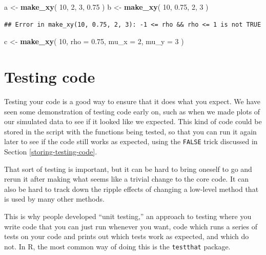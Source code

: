 \documentclass[
]{book}
\newenvironment{Shaded}{\begin{snugshade}}{\end{snugshade}}
\newcommand{\AttributeTok}[1]{\textcolor[rgb]{0.13,0.29,0.53}{#1}}
\newcommand{\DecValTok}[1]{\textcolor[rgb]{0.00,0.00,0.81}{#1}}
\newcommand{\FloatTok}[1]{\textcolor[rgb]{0.00,0.00,0.81}{#1}}
\newcommand{\FunctionTok}[1]{\textcolor[rgb]{0.13,0.29,0.53}{\textbf{#1}}}
\newcommand{\NormalTok}[1]{#1}
\newcommand{\OtherTok}[1]{\textcolor[rgb]{0.56,0.35,0.01}{#1}}
\begin{document}
\begin{Shaded}
\begin{Highlighting}[]
\NormalTok{a }\OtherTok{\textless{}{-}} \FunctionTok{make\_xy}\NormalTok{( }\DecValTok{10}\NormalTok{, }\DecValTok{2}\NormalTok{, }\DecValTok{3}\NormalTok{, }\FloatTok{0.75}\NormalTok{ )}
\NormalTok{b }\OtherTok{\textless{}{-}} \FunctionTok{make\_xy}\NormalTok{( }\DecValTok{10}\NormalTok{, }\FloatTok{0.75}\NormalTok{, }\DecValTok{2}\NormalTok{, }\DecValTok{3}\NormalTok{ )}
\end{Highlighting}
\end{Shaded}

\begin{verbatim}
## Error in make_xy(10, 0.75, 2, 3): -1 <= rho && rho <= 1 is not TRUE
\end{verbatim}

\begin{Shaded}
\begin{Highlighting}[]
\NormalTok{c }\OtherTok{\textless{}{-}} \FunctionTok{make\_xy}\NormalTok{( }\DecValTok{10}\NormalTok{, }\AttributeTok{rho =} \FloatTok{0.75}\NormalTok{, }\AttributeTok{mu\_x =} \DecValTok{2}\NormalTok{, }\AttributeTok{mu\_y =} \DecValTok{3}\NormalTok{ )}
\end{Highlighting}
\end{Shaded}

\section{Testing code}\label{testing-code}

Testing your code is a good way to ensure that it does what you expect.
We have seen some demonstration of testing code early on, such as when we made plots of our simulated data to see if it looked like we expected.
This kind of code could be stored in the script with the functions being tested, so that you can run it again later to see if the code still works as expected, using the \texttt{FALSE} trick discussed in Section \ref{storing-testing-code}.

That sort of testing is important, but it can be hard to bring oneself to go and rerun it after making what seems like a trivial change to the core code.
It can also be hard to track down the ripple effects of changing a low-level method that is used by many other methods.

This is why people developed ``unit testing,'' an approach to testing where you write code that you can just run whenever you want, code which runs a series of tests on your code and prints out which tests work as expected, and which do not.
In R, the most common way of doing this is the \texttt{testthat} package.
\end{document}
